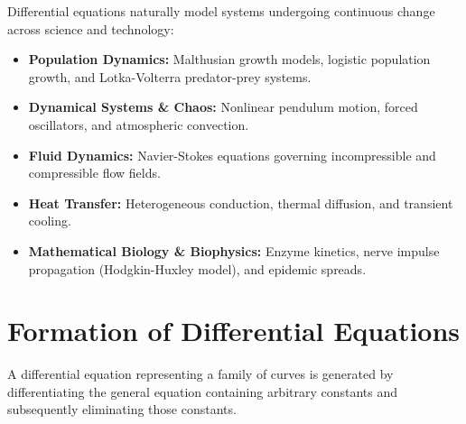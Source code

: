 \documentclass[11pt, a4paper, openany, oneside]{book}
\begin{document}
Differential equations naturally model systems undergoing continuous change across science and technology:
\begin{itemize}[leftmargin=0.6cm]
    \item \textbf{Population Dynamics:} Malthusian growth models, logistic population growth, and Lotka-Volterra predator-prey systems.
    \item \textbf{Dynamical Systems \& Chaos:} Nonlinear pendulum motion, forced oscillators, and atmospheric convection.
    \item \textbf{Fluid Dynamics:} Navier-Stokes equations governing incompressible and compressible flow fields.
    \item \textbf{Heat Transfer:} Heterogeneous conduction, thermal diffusion, and transient cooling.
    \item \textbf{Mathematical Biology \& Biophysics:} Enzyme kinetics, nerve impulse propagation (Hodgkin-Huxley model), and epidemic spreads.
\end{itemize}

\section{Formation of Differential Equations}

A differential equation representing a family of curves is generated by differentiating the general equation containing arbitrary constants and subsequently eliminating those constants.
\end{document}
